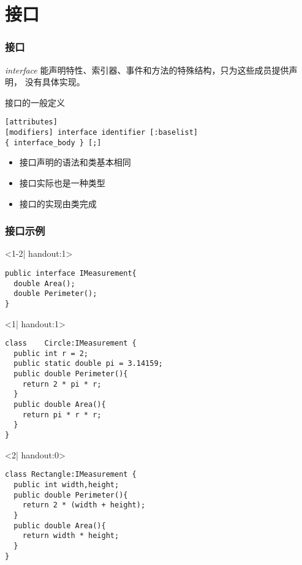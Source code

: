 \section{接口}

\begin{frame}[fragile]
\frametitle{接口}
  \begin{block}{\textit{interface}}
    \CJKindent 能声明特性、索引器、事件和方法的特殊结构，只为这些成员提供声明，
    没有具体实现。
  \end{block}
接口的一般定义
\begin{lstlisting}
[attributes]
[modifiers] interface identifier [:baselist]
{ interface_body } [;]
\end{lstlisting}
\begin{itemize}
\item 接口声明的语法和类基本相同
\item 接口实际也是一种类型
\item 接口的实现由类完成
\end{itemize}
\end{frame}

\begin{frame}[fragile,t]
\frametitle{接口示例}

\begin{onlyenv}<1-2| handout:1>
\begin{lstlisting}
public interface IMeasurement{
  double Area();
  double Perimeter();
}
\end{lstlisting}
\end{onlyenv}
\begin{onlyenv}<1| handout:1>
\begin{lstlisting}
class    Circle:IMeasurement {
  public int r = 2;
  public static double pi = 3.14159;
  public double Perimeter(){
    return 2 * pi * r;
  }
  public double Area(){
    return pi * r * r;
  }
}
\end{lstlisting}
\end{onlyenv}
\begin{onlyenv}<2| handout:0>
\begin{lstlisting}
class Rectangle:IMeasurement {
  public int width,height;
  public double Perimeter(){
    return 2 * (width + height);
  }
  public double Area(){
    return width * height;
  }
}
\end{lstlisting}
\end{onlyenv}
\end{frame}

